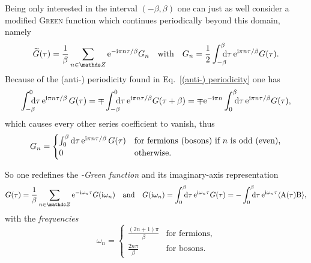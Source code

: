 Being only interested in the interval $(-\beta, \beta)$ one can just as well
consider a modified \textsc{Green} function which continues periodically beyond
this domain, namely
%
\begin{equation*}
    \widetilde G(\tau) = \frac 1 \beta \sum_{n \in \mathds Z}
        \E^{-\I \pi n \tau / \beta} G_n
    \quad \text{with} \quad
    G_n = \frac 1 2 \int \from{-\beta} \till \beta \D \tau \,
        \E^{\I \pi n \tau / \beta} G(\tau).
\end{equation*}
%
Because of the (anti-) periodicity found in Eq.~\ref{(anti-) periodicity} one has
%
\begin{equation*}
    \int \from{-\beta} \till 0 \D \tau \, \E^{\I \pi n \tau / \beta} \, G(\tau)
    = \mp \int \from{-\beta} \till 0 \D \tau \,
        \E^{\I \pi n \tau / \beta} G(\tau + \beta)
    = \mp \E^{-\I \pi n} \int \from 0 \till \beta \D \tau \,
        \E^{\I \pi n \tau / \beta} G(\tau),
\end{equation*}
%
which causes every other series coefficient to vanish, thus
%
\begin{equation*}
    G_n =
    \begin{cases}
        \int_0^\beta \mathrm d \tau \, \mathrm e^{\mathrm i \pi n \tau / \beta} \, G(\tau)
        & \text{for fermions (bosons) if $n$ is odd (even),} \\ 0
        & \text{otherwise.}
    \end{cases}
\end{equation*}

So one redefines the \emph{-Green function} and its
imaginary-axis representation
%
\begin{equation} \label{Matsubara-Green function}
    G(\tau) = \frac 1 \beta \sum_{n \in \mathds Z}
        \E^{-\I \omega_n \tau} G(\I \omega_n)
    \quad \text{and} \quad
    G(\I \omega_n) = \int \from 0 \till \beta \D \tau \,
        \E^{\I \omega_n \tau} G(\tau)
    = -\int \from 0 \till \beta \D \tau \,
        \E^{\I \omega_n \tau} \av{\op A(\tau) \op B},
\end{equation}
%
with the \emph{ frequencies}
%
\begin{equation*}
    \omega_n =
    \begin{cases}
        \frac{(2 n + 1) \pi} \beta & \text{for fermions}, \\
        \frac{2 n \pi} \beta & \text{for bosons.}
    \end{cases}
\end{equation*}

